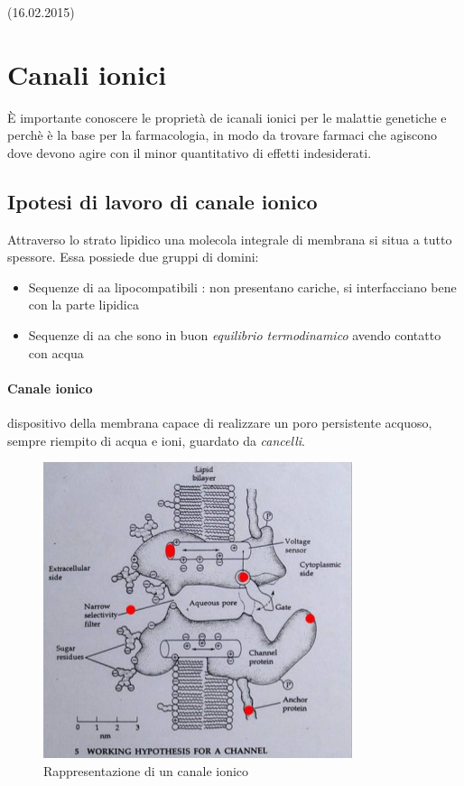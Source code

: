 \documentclass[a4paper,12pt]{article}
\begin{document}
(16.02.2015)

\section{Canali ionici}
È importante conoscere le proprietà de icanali ionici per le malattie genetiche e perchè è la base per la farmacologia, in modo da trovare farmaci che agiscono dove devono agire con il minor quantitativo di effetti indesiderati.

\subsection{Ipotesi di lavoro di canale ionico}
Attraverso lo strato lipidico  una molecola integrale di membrana si situa a tutto spessore. Essa possiede due gruppi di domini:
\begin{itemize}
\item{Sequenze di aa lipocompatibili : non presentano cariche, si interfacciano bene con la parte lipidica}
\item{Sequenze di aa che sono in buon \emph{equilibrio termodinamico} avendo contatto con acqua}
\end{itemize}

\paragraph{Canale ionico} dispositivo della membrana capace di realizzare un poro persistente acquoso, sempre riempito di acqua e ioni, guardato da \emph{cancelli}.
\begin{figure}[H]
\centering
\includegraphics[scale=0.5]{immagine/canali.jpg}
\caption{Rappresentazione di un canale ionico}
\end{figure}
\end{document}
